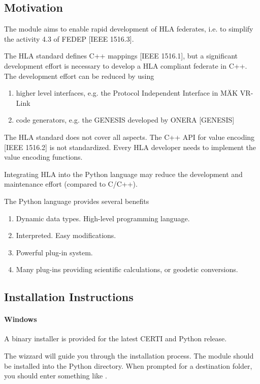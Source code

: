 \documentclass[12pt,a4paper]{howto}
\begin{document}
\subsection{Motivation}

The  module aims to enable rapid development of HLA federates,
i.e. to simplify the activity 4.3 of FEDEP [IEEE 1516.3].

The HLA standard defines C++ mappings [IEEE 1516.1], but a significant
development effort is necessary to develop a HLA compliant federate in C++.
The development effort can be reduced by using
\begin{enumerate}
\item higher level interfaces, e.g. the Protocol Independent Interface in M\"{A}K VR-Link
\item code generators, e.g. the GENESIS developed by ONERA [GENESIS]
\end{enumerate}

The HLA standard does not cover all aspects.
The C++ API for value encoding [IEEE 1516.2] is not standardized. Every HLA
developer needs to implement the value encoding functions.

Integrating HLA into the Python language may reduce the development and
maintenance effort (compared to C/C++).

The Python language provides several benefits
\begin{enumerate}
\item Dynamic data types. High-level programming language.
\item Interpreted. Easy modifications.
\item Powerful plug-in system.
\item Many plug-ins providing scientific calculations, or geodetic conversions.
\end{enumerate}

\subsection{Installation Instructions}

\paragraph{Windows}

A binary installer is provided for the latest CERTI and Python release.

The wizzard will guide you through the installation process. The 
module should be installed into the Python  directory.
When prompted for a destination folder, you should enter something like
.
\end{document}
